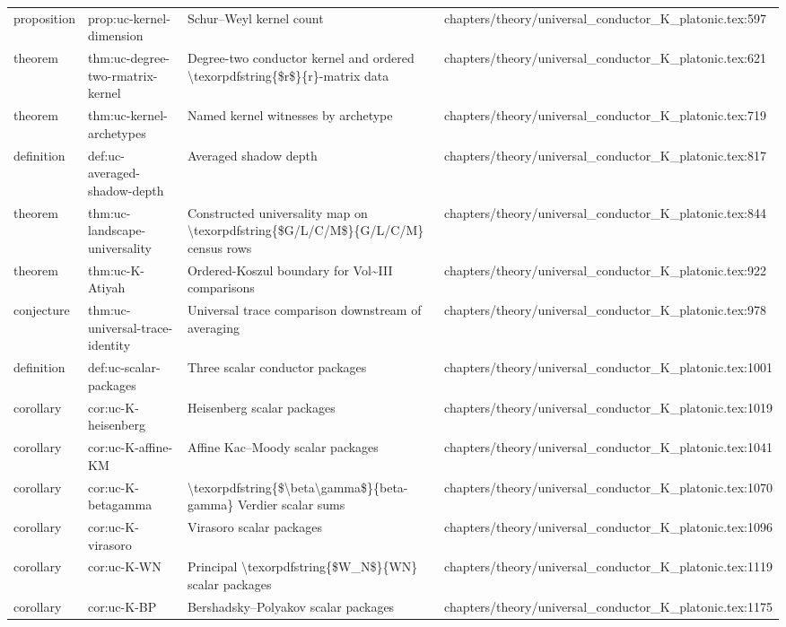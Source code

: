 \documentclass[11pt]{article}
\begin{document}
\begin{longtable}{L{0.10\textwidth}L{0.26\textwidth}L{0.42\textwidth}L{0.22\textwidth}}
proposition & prop:uc-kernel-dimension & Schur--Weyl kernel count & chapters/theory/universal\_conductor\_K\_platonic.tex:597\\
theorem & thm:uc-degree-two-rmatrix-kernel & Degree-two conductor kernel and ordered \textbackslash{}texorpdfstring\{\$r\$\}\{r\}-matrix data & chapters/theory/universal\_conductor\_K\_platonic.tex:621\\
theorem & thm:uc-kernel-archetypes & Named kernel witnesses by archetype & chapters/theory/universal\_conductor\_K\_platonic.tex:719\\
definition & def:uc-averaged-shadow-depth & Averaged shadow depth & chapters/theory/universal\_conductor\_K\_platonic.tex:817\\
theorem & thm:uc-landscape-universality & Constructed universality map on \textbackslash{}texorpdfstring\{\$G/L/C/M\$\}\{G/L/C/M\} census rows & chapters/theory/universal\_conductor\_K\_platonic.tex:844\\
theorem & thm:uc-K-Atiyah & Ordered-Koszul boundary for Vol\textasciitilde{}III comparisons & chapters/theory/universal\_conductor\_K\_platonic.tex:922\\
conjecture & thm:uc-universal-trace-identity & Universal trace comparison downstream of averaging & chapters/theory/universal\_conductor\_K\_platonic.tex:978\\
definition & def:uc-scalar-packages & Three scalar conductor packages & chapters/theory/universal\_conductor\_K\_platonic.tex:1001\\
corollary & cor:uc-K-heisenberg & Heisenberg scalar packages & chapters/theory/universal\_conductor\_K\_platonic.tex:1019\\
corollary & cor:uc-K-affine-KM & Affine Kac--Moody scalar packages & chapters/theory/universal\_conductor\_K\_platonic.tex:1041\\
corollary & cor:uc-K-betagamma & \textbackslash{}texorpdfstring\{\$\textbackslash{}beta\textbackslash{}gamma\$\}\{beta-gamma\} Verdier scalar sums & chapters/theory/universal\_conductor\_K\_platonic.tex:1070\\
corollary & cor:uc-K-virasoro & Virasoro scalar packages & chapters/theory/universal\_conductor\_K\_platonic.tex:1096\\
corollary & cor:uc-K-WN & Principal \textbackslash{}texorpdfstring\{\$W\_N\$\}\{WN\} scalar packages & chapters/theory/universal\_conductor\_K\_platonic.tex:1119\\
corollary & cor:uc-K-BP & Bershadsky--Polyakov scalar packages & chapters/theory/universal\_conductor\_K\_platonic.tex:1175\\

\end{longtable}
\end{document}
